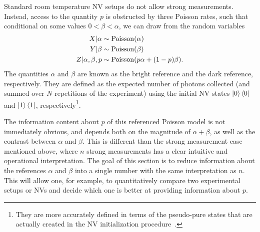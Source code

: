 \documentclass[aps,nofootinbib,prl,twocolumn,superscriptaddress]{revtex4}
\begin{document}
Standard room temperature NV setups do not allow strong measurements. 
Instead, access to the quantity $p$ is obstructed by three Poisson rates,
such that conditional on some values $0<\beta<\alpha$, we can 
draw from the random variables
\begin{align}
    X|\alpha &\sim \operatorname{Poisson}(\alpha) \nonumber \\
    Y|\beta &\sim \operatorname{Poisson}(\beta) \nonumber \\
    Z|\alpha,\beta,p &\sim \operatorname{Poisson}(p\alpha + (1-p)\beta).
\end{align}
The quantities $\alpha$ and $\beta$ are known as the bright reference
and the dark reference, respectively.
They are defined as the 
expected number of photons collected (and summed over $N$
repetitions of the experiment) using the initial NV states
$\ket{0}\bra{0}$ and $\ket{1}\bra{1}$, respectively\footnote{They are
more accurately defined in terms of the pseudo-pure states 
that are actually created in the NV initialization procedure~\cite{hincks_statistical_2017}.}.

The information content about $p$ of this referenced Poisson model is not
immediately obvious, 
and depends both on the magnitude of $\alpha+\beta$, 
as well as the contrast between $\alpha$ and $\beta$.
This is different than the strong measurement case mentioned above,
where $n$ strong measurements has a clear intuitive and operational 
interpretation.
The goal of this section is to reduce information about the references
$\alpha$ and $\beta$ into a single number 
with the same interpretation as $n$.
This will allow one, for example,
to quantitatively compare two experimental setups or NVs and
decide which one is better at providing information about $p$. 
\end{document}

